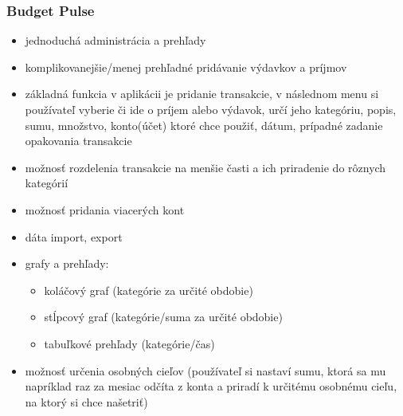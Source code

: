\documentclass[12pt]{book}
\begin{document}
\subsubsection{Budget Pulse \cite{BudgetPulse}\ }
\begin{itemize}
\item{jednoduchá administrácia a prehľady}
\item{komplikovanejšie/menej prehľadné pridávanie výdavkov a príjmov}
\item{základná funkcia v aplikácii je pridanie transakcie, v následnom menu si používateľ vyberie či ide o príjem alebo výdavok, určí jeho kategóriu, popis, sumu, množstvo, konto(účet) ktoré chce použiť, dátum, prípadné zadanie opakovania transakcie}
\item{možnosť rozdelenia transakcie na menšie časti a ich priradenie do rôznych kategórií}
\item{možnosť pridania viacerých kont}
\item{dáta import, export}
\item{grafy a prehľady:}
\begin{itemize}
\item{koláčový graf (kategórie za určité obdobie)}
\item{stĺpcový graf (kategórie/suma za určité obdobie)}
\item{tabuľkové prehľady (kategórie/čas)}
\end{itemize}
\item{možnosť určenia osobných cieľov (používateľ si nastaví sumu, ktorá sa mu napríklad raz za mesiac odčíta z konta a priradí k určitému osobnému cieľu, na ktorý si chce našetriť)}
\end{itemize}
\end{document}
